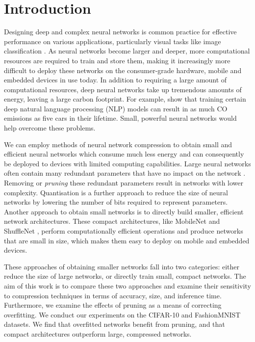 \documentclass[conference]{IEEEtran}
\begin{document}
\section{Introduction}

Designing deep and complex neural networks is common practice for effective performance on various applications, particularly visual tasks like image classification \cite{liu2017surveydeep}. As neural networks become larger and deeper, more computational resources are required to train and store them, making it increasingly more difficult to deploy these networks on the consumer-grade hardware, mobile and embedded devices in use today. In addition to requiring a large amount of computational resources, deep neural networks take up tremendous amounts of energy, leaving a large carbon footprint. For example, \cite{strubell1906energy} show that training certain deep natural language processing (NLP) models can result in as much CO emissions as five cars in their lifetime. Small, powerful neural networks would help overcome these problems.

We can employ methods of neural network compression to obtain small and efficient neural networks which consume much less energy and can consequently be deployed to devices with limited computing capabilities. Large neural networks often contain many redundant parameters that have no impact on the network \cite{denil2013predicting}. Removing or \emph{pruning} these redundant parameters result in networks with lower complexity. Quantisation is a further approach to reduce the size of neural networks by lowering the number of bits required to represent parameters. Another approach to obtain small networks is to directly build smaller, efficient network architectures. These compact architectures, like MobileNet \cite{howard2017mobilenets} and ShuffleNet \cite{zhang2018shufflenet}, perform computationally efficient operations and produce networks that are small in size, which makes them easy to deploy on mobile and embedded devices.

These approaches of obtaining smaller networks fall into two categories: either reduce the size of large networks, or directly train small, compact networks. The aim of this work is to compare these two approaches and examine their sensitivity to compression techniques in terms of accuracy, size, and inference time. Furthermore, we examine the effects of pruning as a means of correcting overfitting. We conduct our experiments on the CIFAR-10 \cite{krizhevsky2014cifar} and FashionMNIST \cite{xiao2017fashion} datasets. We find that overfitted networks benefit from pruning, and that compact architectures outperform large, compressed networks.
\end{document}
